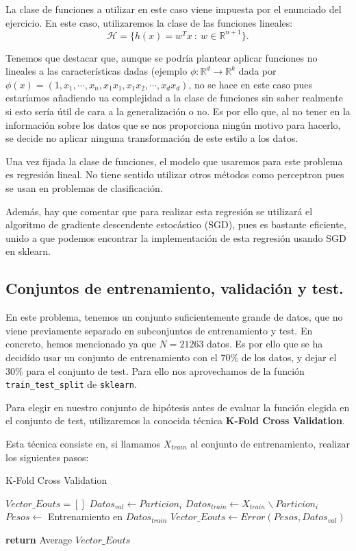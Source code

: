 \documentclass[a4paper, 20pt]{article}
\newcommand{\R}{\mathbb R}
\begin{document}
La clase de funciones a utilizar en este caso viene impuesta por el enunciado del ejercicio. En este caso, utilizaremos la clase de las funciones lineales:
$$
\mathcal H = \{ h(x) = w^T x \ : \ w \in \R^{n+1}\}.
$$

Tenemos que destacar que, aunque se podría plantear aplicar funciones no lineales a las características dadas (ejemplo $\phi :\R^d \to \R^{k}$ dada por $\phi(x) = (1,x_1,\cdots,x_n,x_1x_1,x_1x_2,\cdots,x_dx_d)$, no se hace en este caso pues estaríamos añadiendo ua complejidad a la clase de funciones sin saber realmente si esto sería útil de cara a la generalización o no. Es por ello que, al no tener en la información sobre los datos que se nos proporciona ningún motivo para hacerlo, se decide no aplicar ninguna transformación de este estilo a los datos.

Una vez fijada la clase de funciones, el modelo que usaremos para este problema es regresión lineal. No tiene sentido utilizar otros métodos como perceptron pues se usan en problemas de clasificación. 

Además, hay que comentar que para realizar esta regresión se utilizará el algoritmo de gradiente descendente estocástico (SGD), pues es bastante eficiente, unido a que podemos encontrar la implementación de esta regresión usando SGD en sklearn.

\subsection{Conjuntos de entrenamiento, validación y test.}

En este problema, tenemos un conjunto suficientemente grande de datos, que no viene previamente separado en subconjuntos de entrenamiento y test. En concreto, hemos mencionado ya que $N = 21263$ datos. Es por ello que se ha decidido usar un conjunto de entrenamiento con el $70\%$ de los datos, y dejar el $30\%$ para el conjunto de test. Para ello nos aprovechamos de la función \lstinline{train_test_split} de \lstinline{sklearn}.

Para elegir en nuestro conjunto de hipótesis antes de evaluar la función elegida en el conjunto de test, utilizaremos la conocida técnica \textbf{K-Fold Cross Validation}.

Esta técnica consiste en, si llamamos $X_{train}$ al conjunto de entrenamiento, realizar los siguientes pasos:
\begin{algorithm}[H]
  \caption{K-Fold Cross Validation}
  \begin{algorithmic}[1]
  \State $Vector\_Eouts = []$
    \State $ Datos_{val} \gets Particion_i$
    \State $ Datos_{train} \gets X_{train} \backslash Particion _i$
    \State $ Pesos \gets $ Entrenamiento en $Datos_{train}$
    \State $ Vector\_Eouts \gets Error(Pesos, Datos_{val})$

  \EndFor

  \State \textbf{return} Average $Vector\_Eouts$
  
  \end{algorithmic}
\end{algorithm}
\end{document}
